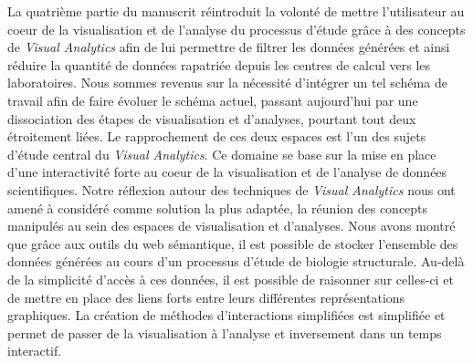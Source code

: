 

La quatrième partie du manuscrit réintroduit la volonté de mettre l'utilisateur au coeur de la visualisation et de l'analyse du processus d'étude grâce à des concepts de \textit{Visual Analytics} afin de lui permettre de filtrer les données générées et ainsi réduire la quantité de données rapatriée depuis les centres de calcul vers les laboratoires. Nous sommes revenus sur la nécessité d'intégrer un tel schéma de travail afin de faire évoluer le schéma actuel, passant aujourd'hui par une dissociation des étapes de visualisation et d'analyses, pourtant tout deux étroitement liées.
Le rapprochement de ces deux espaces est l'un des sujets d'étude central du \textit{Visual Analytics}. Ce domaine se base sur la mise en place d'une interactivité forte au coeur de la visualisation et de l'analyse de données scientifiques. Notre réflexion autour des techniques de \textit{Visual Analytics} nous ont amené à considéré comme solution la plus adaptée, la réunion des concepts manipulés au sein des espaces de visualisation et d'analyses.
Nous avons montré que grâce aux outils du web sémantique, il est possible de stocker l'ensemble des données générées au cours d'un processus d'étude de biologie structurale. Au-delà de la simplicité d'accès à ces données, il est possible de raisonner sur celles-ci et de mettre en place des liens forts entre leurs différentes représentations graphiques. La création de méthodes d'interactions simplifiées est simplifiée et permet de passer de la visualisation à l'analyse et inversement dans un temps interactif.

